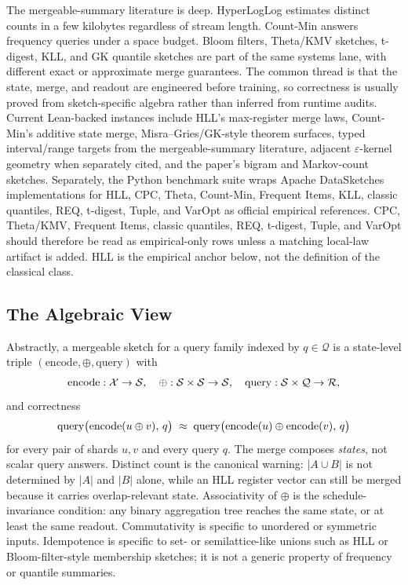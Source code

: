 The mergeable-summary literature is deep. HyperLogLog
\citep{FlajoletEtAl2007,HeuleEtAl2013} estimates distinct counts in a few
kilobytes regardless of stream length. Count-Min
\citep{CormodeMuthukrishnan2005} answers frequency queries under a space
budget. Bloom filters, Theta/KMV sketches, t-digest, KLL, and GK quantile
sketches are part of the same systems lane, with different exact or
approximate merge guarantees. The common thread is that the state,
merge, and readout are engineered before training, so correctness is
usually proved from sketch-specific algebra rather than inferred from
runtime audits. Current Lean-backed instances include HLL's max-register merge
laws, Count-Min's additive state merge, Misra--Gries/GK-style theorem surfaces,
typed interval/range targets from the mergeable-summary literature, adjacent
$\varepsilon$-kernel geometry when separately cited, and the paper's bigram
and Markov-count sketches. Separately, the Python benchmark suite wraps
Apache DataSketches implementations for HLL, CPC, Theta, Count-Min,
Frequent Items, KLL, classic quantiles, REQ, t-digest, Tuple, and VarOpt
as official empirical references. CPC, Theta/KMV, Frequent Items, classic
quantiles, REQ, t-digest, Tuple, and VarOpt should therefore be read as
empirical-only rows unless a matching local-law artifact is added. HLL is
the empirical anchor below, not the definition of the classical class.

\subsection{The Algebraic View}

Abstractly, a mergeable sketch for a query family indexed by $q \in \mathcal{Q}$
is a state-level triple $(\mathrm{encode}, \oplus, \mathrm{query})$ with
\[
\mathrm{encode} : \mathcal{X} \to \mathcal{S}, \quad
\oplus : \mathcal{S} \times \mathcal{S} \to \mathcal{S}, \quad
\mathrm{query} : \mathcal{S} \times \mathcal{Q} \to \mathcal{R},
\]
and correctness
\[
\mathrm{query}\big(\mathrm{encode}(u \oplus v),\, q\big)
\;\approx\;
\mathrm{query}\big(\mathrm{encode}(u) \oplus \mathrm{encode}(v),\, q\big)
\]
for every pair of shards $u, v$ and every query $q$. The merge composes
\emph{states}, not scalar query answers. Distinct count is the canonical
warning: $|A \cup B|$ is not determined by $|A|$ and $|B|$ alone, while an
HLL register vector can still be merged because it carries overlap-relevant
state. Associativity of $\oplus$ is the schedule-invariance condition: any
binary aggregation tree reaches the same state, or at least the same readout.
Commutativity is specific to unordered or symmetric inputs. Idempotence is
specific to set- or semilattice-like unions such as HLL or Bloom-filter-style
membership sketches; it is not a generic property of frequency or quantile
summaries.

